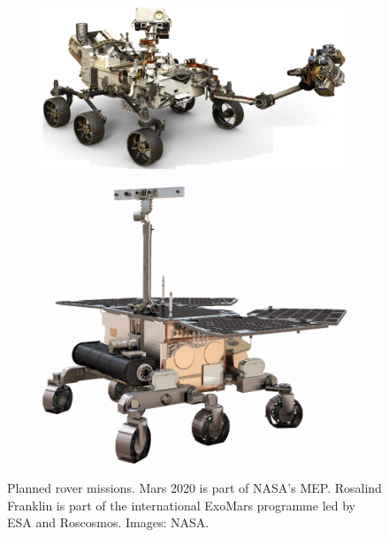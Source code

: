 \begin{figure}[h]
\captionsetup[subfigure]{justification=centering}
\vspace{-2ex}
	\centering
    \setlength{\graphicsHeight}{50mm}
    \hypersetup{hidelinks=true}%
	\begin{subfigure}[t]{0.65\textwidth}
        \centering
		\includegraphics[height=\graphicsHeight]{sections/state-of-the-art/planned-missions/images/rover-mars2020.png}
		\label{fig:sub:planned-mission-rover-mars2020}
	\end{subfigure}\hfill
	\begin{subfigure}[t]{0.35\textwidth}
        \centering
		\includegraphics[height=\graphicsHeight]{sections/state-of-the-art/planned-missions/images/rover-exomars.png}
		\label{fig:sub:planned-mission-rover-exomars}
	\end{subfigure}
	\caption[Planned rover missions]
            {Planned rover missions. Mars 2020 is part of \ac{NASA}'s \ac{MEP}. Rosalind Franklin is part of the international ExoMars programme led by \ac{ESA} and Roscosmos. Images: NASA.}
	\label{fig:planned-mission-rovers}
\vspace{-2ex}
\end{figure}

